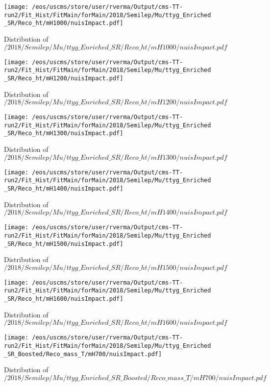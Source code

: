 \begin{figure}
\centering
\texttt{[image: /eos/uscms/store/user/rverma/Output/cms-TT-run2/Fit\_Hist/FitMain/forMain/2018/Semilep/Mu/ttyg\_Enriched\_SR/Reco\_ht/mH1000/nuisImpact.pdf]}
\caption{Distribution of $/2018/Semilep/Mu/ttyg\_Enriched\_SR/Reco\_ht/mH1000/nuisImpact.pdf$}
\end{figure}

\begin{figure}
\centering
\texttt{[image: /eos/uscms/store/user/rverma/Output/cms-TT-run2/Fit\_Hist/FitMain/forMain/2018/Semilep/Mu/ttyg\_Enriched\_SR/Reco\_ht/mH1200/nuisImpact.pdf]}
\caption{Distribution of $/2018/Semilep/Mu/ttyg\_Enriched\_SR/Reco\_ht/mH1200/nuisImpact.pdf$}
\end{figure}

\begin{figure}
\centering
\texttt{[image: /eos/uscms/store/user/rverma/Output/cms-TT-run2/Fit\_Hist/FitMain/forMain/2018/Semilep/Mu/ttyg\_Enriched\_SR/Reco\_ht/mH1300/nuisImpact.pdf]}
\caption{Distribution of $/2018/Semilep/Mu/ttyg\_Enriched\_SR/Reco\_ht/mH1300/nuisImpact.pdf$}
\end{figure}

\begin{figure}
\centering
\texttt{[image: /eos/uscms/store/user/rverma/Output/cms-TT-run2/Fit\_Hist/FitMain/forMain/2018/Semilep/Mu/ttyg\_Enriched\_SR/Reco\_ht/mH1400/nuisImpact.pdf]}
\caption{Distribution of $/2018/Semilep/Mu/ttyg\_Enriched\_SR/Reco\_ht/mH1400/nuisImpact.pdf$}
\end{figure}

\begin{figure}
\centering
\texttt{[image: /eos/uscms/store/user/rverma/Output/cms-TT-run2/Fit\_Hist/FitMain/forMain/2018/Semilep/Mu/ttyg\_Enriched\_SR/Reco\_ht/mH1500/nuisImpact.pdf]}
\caption{Distribution of $/2018/Semilep/Mu/ttyg\_Enriched\_SR/Reco\_ht/mH1500/nuisImpact.pdf$}
\end{figure}

\begin{figure}
\centering
\texttt{[image: /eos/uscms/store/user/rverma/Output/cms-TT-run2/Fit\_Hist/FitMain/forMain/2018/Semilep/Mu/ttyg\_Enriched\_SR/Reco\_ht/mH1600/nuisImpact.pdf]}
\caption{Distribution of $/2018/Semilep/Mu/ttyg\_Enriched\_SR/Reco\_ht/mH1600/nuisImpact.pdf$}
\end{figure}

\begin{figure}
\centering
\texttt{[image: /eos/uscms/store/user/rverma/Output/cms-TT-run2/Fit\_Hist/FitMain/forMain/2018/Semilep/Mu/ttyg\_Enriched\_SR\_Boosted/Reco\_mass\_T/mH700/nuisImpact.pdf]}
\caption{Distribution of $/2018/Semilep/Mu/ttyg\_Enriched\_SR\_Boosted/Reco\_mass\_T/mH700/nuisImpact.pdf$}
\end{figure}

